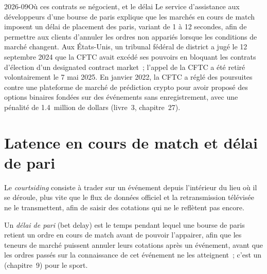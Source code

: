 \begin{dated}{2026-09}{Où ces contrats se négocient, et le délai}\label{dat:hf:prediction-and-sports-market-making:venues}
Le service d'assistance aux développeurs d'une bourse de paris explique que les marchés en cours de match imposent un délai de placement des paris, variant de 1 à 12 secondes, afin de permettre aux clients
d'annuler les ordres non appariés lorsque les conditions de marché changent. Aux États-Unis, un tribunal fédéral de district a jugé le 12 septembre 2024 que la CFTC avait
excédé ses pouvoirs en bloquant les contrats d'élection d'un designated contract market~; l'appel de la CFTC a été retiré volontairement le 7 mai 2025.
En janvier 2022, la CFTC a réglé des poursuites contre une plateforme de marché de prédiction crypto pour avoir proposé des options binaires fondées sur des événements sans enregistrement, avec une
pénalité de 1.4~million de dollars (livre~3, chapitre~27).
\end{dated}

\section{Latence en cours de match et délai de pari}

\begin{definition}[Courtsiding]\label{def:hf:prediction-and-sports-market-making:courtsiding}
Le \emph{courtsiding} consiste à trader sur un événement depuis l'intérieur du lieu où il se déroule, plus vite que le flux de données officiel et la
retransmission télévisée ne le transmettent, afin de saisir des cotations qui ne le reflètent pas encore.
\end{definition}

\begin{definition}\label{def:hf:prediction-and-sports-market-making:delay}
Un \emph{délai de pari} (bet delay) est le temps pendant lequel une bourse de paris retient un ordre en cours de match avant de pouvoir l'appairer, afin que les teneurs de marché puissent annuler
leurs cotations après un événement, avant que les ordres passés sur la connaissance de cet événement ne les atteignent~; c'est un  (chapitre~9) pour le sport.
\end{definition}

